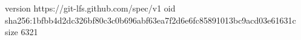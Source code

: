 version https://git-lfs.github.com/spec/v1
oid sha256:1bfbb4d2dc326bf80c3c0b696abf63ea7f2d6e6fc85891013bc9acd03e61631c
size 6321
